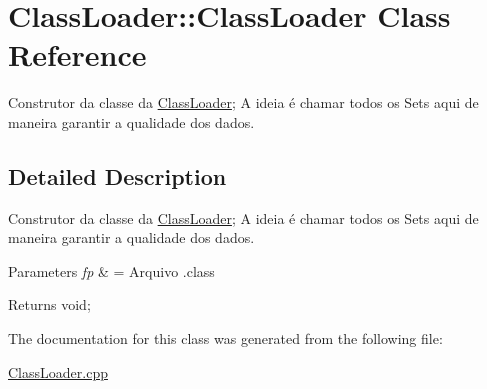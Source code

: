 \hypertarget{class_class_loader_1_1_class_loader}{}\section{Class\+Loader\+:\+:Class\+Loader Class Reference}
\label{class_class_loader_1_1_class_loader}


Construtor da classe da \hyperlink{class_class_loader_1_1_class_loader}{Class\+Loader}; A ideia é chamar todos os Set\textquotesingle{}s aqui de maneira garantir a qualidade dos dados.  




\subsection{Detailed Description}
Construtor da classe da \hyperlink{class_class_loader_1_1_class_loader}{Class\+Loader}; A ideia é chamar todos os Set\textquotesingle{}s aqui de maneira garantir a qualidade dos dados. 


\begin{DoxyParams}{Parameters}
{\em fp} & = Arquivo .class \\
\hline
\end{DoxyParams}
\begin{DoxyReturn}{Returns}
void; 
\end{DoxyReturn}


The documentation for this class was generated from the following file\+:\begin{DoxyCompactItemize}
\item 
\hyperlink{_class_loader_8cpp}{Class\+Loader.\+cpp}\end{DoxyCompactItemize}
